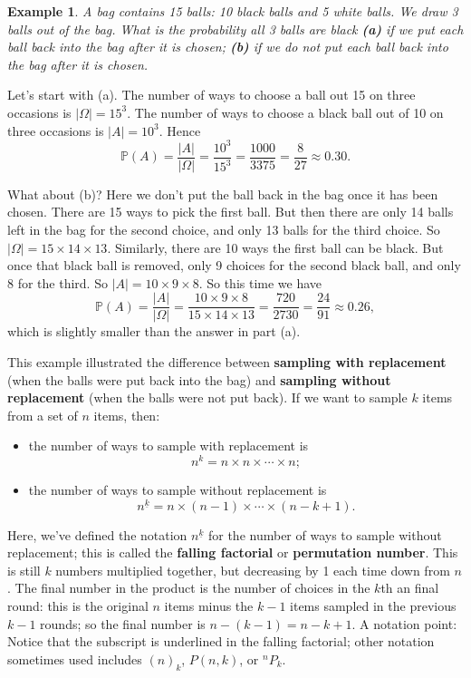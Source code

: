 \documentclass[
  a4paper,
]{book}
\providecommand{\tightlist}{%
  \setlength{\itemsep}{0pt}\setlength{\parskip}{0pt}}
\theoremstyle{definition}
\theoremstyle{definition}
\newtheorem{example}{Example}[chapter]
\theoremstyle{definition}
\theoremstyle{definition}
\theoremstyle{remark}
\begin{document}
\begin{example}
\emph{A bag contains 15 balls: 10 black balls and 5 white balls. We draw 3 balls out of the bag. What is the probability all 3 balls are black \textbf{(a)} if we put each ball back into the bag after it is chosen; \textbf{(b)} if we do not put each ball back into the bag after it is chosen.}

Let's start with (a). The number of ways to choose a ball out 15 on three occasions is \(|\Omega| = 15^3\). The number of ways to choose a black ball out of 10 on three occasions is \(|A| = 10^3\). Hence
\[ \mathbb P(A) = \frac{|A|}{|\Omega|} = \frac{10^3}{15^3} =  \frac{1000}{3375} = \frac{8}{27} \approx 0.30. \]

What about (b)? Here we don't put the ball back in the bag once it has been chosen. There are 15 ways to pick the first ball. But then there are only 14 balls left in the bag for the second choice, and only 13 balls for the third choice. So \(|\Omega| = 15\times14\times13\). Similarly, there are 10 ways the first ball can be black. But once that black ball is removed, only 9 choices for the second black ball, and only 8 for the third. So \(|A| = 10\times9\times8\). So this time we have
\[ \mathbb P(A) = \frac{|A|}{|\Omega|} = \frac{10\times9\times8}{15\times14\times13} =  \frac{720}{2730} = \frac{24}{91} \approx 0.26, \]
which is slightly smaller than the answer in part (a).
\end{example}

This example illustrated the difference between \textbf{sampling with replacement} (when the balls were put back into the bag) and \textbf{sampling without replacement} (when the balls were not put back). If we want to sample \(k\) items from a set of \(n\) items, then:

\begin{itemize}
\tightlist
\item
  the number of ways to sample with replacement is
  \[ n^k = n\times n\times\cdots\times n;  \]
\item
  the number of ways to sample without replacement is
  \[ {n}^{\underline{k}} = n\times(n-1)\times \cdots\times (n-k+1) .\]
\end{itemize}

Here, we've defined the notation \({n}^{\underline{k}}\) for the number of ways to sample without replacement; this is called the \textbf{falling factorial} or \textbf{permutation number}. This is still \(k\) numbers multiplied together, but decreasing by 1 each time down from \(n\). The final number in the product is the number of choices in the \(k\)th an final round: this is the original \(n\) items minus the \(k-1\) items sampled in the previous \(k-1\) rounds; so the final number is \(n - (k-1) = n - k + 1\). A notation point: Notice that the subscript is underlined in the falling factorial; other notation sometimes used includes \((n)_k\), \(P(n,k)\), or \({}^nP_k\).
\end{document}
